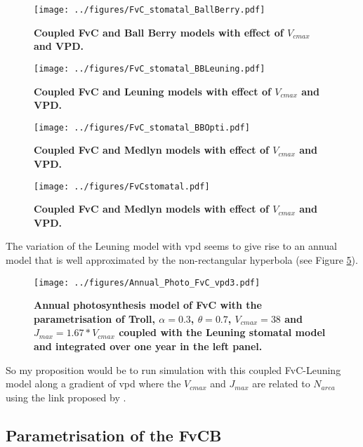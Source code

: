 \documentclass[a4paper,11pt]{article}
\begin{document}
\begin{figure}[ht]
\centering
\texttt{[image: ../figures/FvC\_stomatal\_BallBerry.pdf]}
\caption{\textbf{Coupled FvC and Ball Berry models with effect of $V_{cmax}$ and VPD.}
\label{fig:photo_stomat_BB}}
\end{figure}

\begin{figure}[ht]
\centering
\texttt{[image: ../figures/FvC\_stomatal\_BBLeuning.pdf]}
\caption{\textbf{Coupled FvC and Leuning models with effect of $V_{cmax}$ and VPD.}
\label{fig:photo_stomat_Leuning}}
\end{figure}

\begin{figure}[ht]
\centering
\texttt{[image: ../figures/FvC\_stomatal\_BBOpti.pdf]}
\caption{\textbf{Coupled FvC and Medlyn models with effect of $V_{cmax}$ and VPD.}
\label{fig:photo_stomat_opti}}
\end{figure}

\begin{figure}[ht]
\centering
\texttt{[image: ../figures/FvCstomatal.pdf]}
\caption{\textbf{Coupled FvC and Medlyn models with effect of $V_{cmax}$ and VPD.}
\label{fig:photo_stomat}}
\end{figure}

\clearpage

The variation of the Leuning model with vpd seems to give rise to an annual model that is well approximated by the non-rectangular hyperbola (see Figure \ref{fig:photo_annu_fvc_vpd3}).

\begin{figure}[ht]
\centering
\texttt{[image: ../figures/Annual\_Photo\_FvC\_vpd3.pdf]}
\caption{\textbf{Annual photosynthesis model of FvC with the parametrisation of Troll, $\alpha = 0.3$, $\theta = 0.7$, $V_{cmax} = 38$ and $J_{max} = 1.67 * V_{cmax}$ coupled with the Leuning stomatal model and integrated over one year in the left panel.}
\label{fig:photo_annu_fvc_vpd3}}
\end{figure}

So my proposition would be to run simulation with this coupled FvC-Leuning model along a gradient of vpd where the $V_{cmax}$ and $J_{max}$ are related to $N_{area}$ using the link proposed by \citep{Sakschewski-2015}.

\pagebreak


\subsection{Parametrisation of the FvCB}
\end{document}
